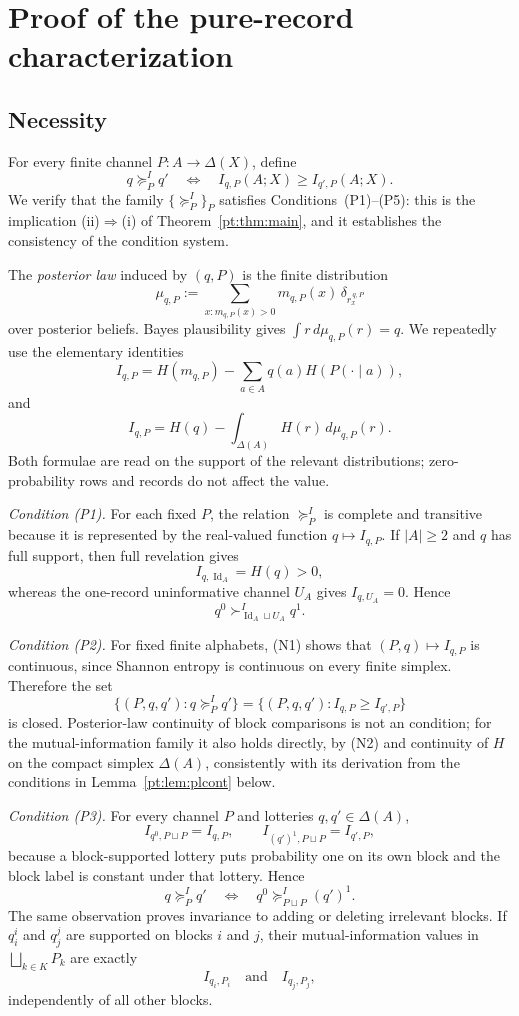 \documentclass[11pt,a4paper]{article}
\theoremstyle{definition}
\newcommand{\Sh}{H}
\newcommand{\Id}{\operatorname{Id}}
\newcommand{\1}{\mathbf 1}
\begin{document}
\section{Proof of the pure-record characterization}\label{pt:app:sufficiency}

\subsection{Necessity}

For every finite channel $P:A\to\Delta(X)$, define
\[
q\succeq^I_P q'
\quad\Longleftrightarrow\quad
I_{q,P}(A;X)\ge I_{q',P}(A;X).
\]
We verify that the family $\{\succeq^I_P\}_P$ satisfies Conditions~\textup{(P1)--(P5)}: this is the implication
\textup{(ii)$\Rightarrow$(i)} of Theorem~\ref{pt:thm:main}, and it establishes the consistency of the condition
system.

The \emph{posterior law} induced by $(q,P)$ is the finite distribution
\[
\mu_{q,P}:=
\sum_{x:m_{q,P}(x)>0}m_{q,P}(x)\,\delta_{r_x^{\,q,P}}
\]
over posterior beliefs.  Bayes plausibility gives $\int r\,d\mu_{q,P}(r)=q$.  We repeatedly use the elementary identities
\[
I_{q,P}
=
\Sh(m_{q,P})-\sum_{a\in A}q(a)\Sh(P(\cdot\mid a)),
\tag{N1}
\]
and
\[
I_{q,P}
=
\Sh(q)-\int_{\Delta(A)}\Sh(r)\,d\mu_{q,P}(r).
\tag{N2}
\]
Both formulae are read on the support of the relevant distributions; zero-probability rows and records do not affect the
value.

\emph{Condition \textup{(P1)}.}
For each fixed $P$, the relation $\succeq^I_P$ is complete and transitive because it is represented by the real-valued
function $q\mapsto I_{q,P}$.  If $|A|\ge2$ and $q$ has full support, then full revelation gives
\[
I_{q,\Id_A}=\Sh(q)>0,
\]
whereas the one-record uninformative channel $U_A$ gives $I_{q,U_A}=0$.  Hence
\[
q^0\succ^I_{\Id_A\sqcup U_A}q^1.
\]

\emph{Condition \textup{(P2)}.}
For fixed finite alphabets, (N1) shows that $(P,q)\mapsto I_{q,P}$ is continuous, since Shannon entropy is continuous on
every finite simplex.  Therefore the set
\[
\{(P,q,q'):q\succeq^I_P q'\}
=
\{(P,q,q'):I_{q,P}\ge I_{q',P}\}
\]
is closed.  Posterior-law continuity of block comparisons is not an condition; for the mutual-information family it also
holds directly, by (N2) and continuity of $\Sh$ on the compact simplex $\Delta(A)$, consistently with its derivation
from the conditions in Lemma~\ref{pt:lem:plcont} below.

\emph{Condition \textup{(P3)}.}
For every channel $P$ and lotteries $q,q'\in\Delta(A)$,
\[
I_{q^0,P\sqcup P}=I_{q,P},
\qquad
I_{(q')^1,P\sqcup P}=I_{q',P},
\]
because a block-supported lottery puts probability one on its own block and the block label is constant under that
lottery.  Hence
\[
q\succeq^I_P q'
\quad\Longleftrightarrow\quad
q^0\succeq^I_{P\sqcup P}(q')^1.
\]
The same observation proves invariance to adding or deleting irrelevant blocks.  If $q_i^i$ and $q_j^j$ are supported on
blocks $i$ and $j$, their mutual-information values in $\bigsqcup_{k\in K}P_k$ are exactly
\[
I_{q_i,P_i}
\quad\text{and}\quad
I_{q_j,P_j},
\]
independently of all other blocks.
\end{document}
